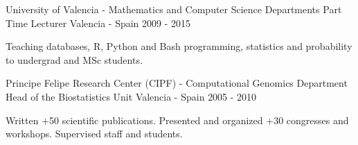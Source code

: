 \begin{cventries}

\cventry
{University of Valencia - Mathematics and Computer Science Departments} %
{Part Time Lecturer} %
{Valencia - Spain} %
{2009 - 2015} %
{ %
\begin{cvitems}
\item {Teaching databases, R, Python and Bash programming, statistics and probability to undergrad and MSc students.}
\end{cvitems} 
}


\cventry
{Principe Felipe Research Center (CIPF) - Computational Genomics Department} %
{Head of the Biostatistics Unit} %
{Valencia - Spain} %
{2005 - 2010} %
{ %
\begin{cvitems}
\item {Written +50 scientific publications. Presented and organized +30 congresses and workshops. Supervised staff and students.}
\end{cvitems} 
}




\end{cventries}
